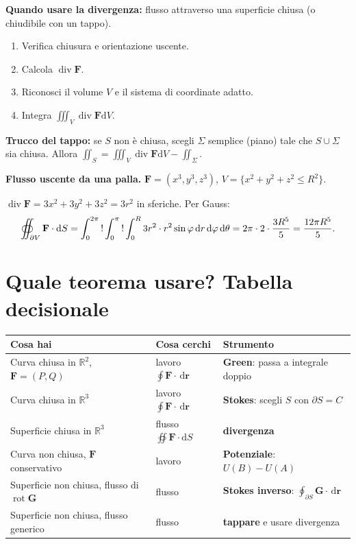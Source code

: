 \documentclass[11pt,a4paper,openany]{book}
\theoremstyle{plain}
\theoremstyle{definition}
\theoremstyle{remark}
\newcommand{\R}{\mathbb{R}}
\newcommand{\dd}{\,\mathrm{d}}
\newcommand{\Div}{\operatorname{div}}
\newcommand{\Rot}{\operatorname{rot}}
\renewcommand{\vec}[1]{\mathbf{#1}}
\newcommand{\F}{\mathbf{F}}
\newcommand{\rr}{\mathbf{r}}
\newcommand{\dS}{\mathrm{d}S}
\newcommand{\dV}{\mathrm{d}V}
\begin{document}
\begin{ricetta}
\textbf{Quando usare la divergenza:} flusso attraverso una superficie chiusa
(o chiudibile con un tappo).
\begin{enumerate}[leftmargin=*]
  \item Verifica chiusura e orientazione uscente.
  \item Calcola $\Div\F$.
  \item Riconosci il volume $V$ e il sistema di coordinate adatto.
  \item Integra $\iiint_V\Div\F\dV$.
\end{enumerate}
\textbf{Trucco del tappo:} se $S$ non \`e chiusa, scegli $\Sigma$ semplice
(piano) tale che $S\cup\Sigma$ sia chiusa. Allora
$\iint_S=\iiint_V\Div\F\dV-\iint_\Sigma$.
\end{ricetta}

\begin{esempio}
\textbf{Flusso uscente da una palla.} $\F=(x^3,y^3,z^3)$,
$V=\{x^2+y^2+z^2\le R^2\}$.

$\Div\F=3x^2+3y^2+3z^2=3r^2$ in sferiche. Per Gauss:
\[
  \oiint_{\partial V}\F\cdot\dS=\int_0^{2\pi}\\!\int_0^\pi\\!\int_0^R 3r^2\cdot r^2\sin\varphi\dd r\dd\varphi\dd\theta
  =2\pi\cdot 2\cdot\frac{3R^5}{5}=\frac{12\pi R^5}{5}.
\]
\end{esempio}

\section{Quale teorema usare? Tabella decisionale}

\begin{center}
\renewcommand{\arraystretch}{1.25}
\begin{tabular}{|p{4.2cm}|p{4.2cm}|p{6cm}|}
\hline
\textbf{Cosa hai} & \textbf{Cosa cerchi} & \textbf{Strumento}\\\hline
Curva chiusa in $\R^2$, $\F=(P,Q)$ & lavoro $\oint\F\cdot\dd\rr$ & \textbf{Green}: passa a integrale doppio\\\hline
Curva chiusa in $\R^3$ & lavoro $\oint\F\cdot\dd\rr$ & \textbf{Stokes}: scegli $S$ con $\partial S=C$\\\hline
Superficie chiusa in $\R^3$ & flusso $\oiint\F\cdot\dS$ & \textbf{divergenza}\\\hline
Curva non chiusa, $\F$ conservativo & lavoro & \textbf{Potenziale}: $U(B)-U(A)$\\\hline
Superficie non chiusa, flusso di $\Rot\vec{G}$ & flusso & \textbf{Stokes inverso}: $\oint_{\partial S}\vec{G}\cdot\dd\rr$\\\hline
Superficie non chiusa, flusso generico & flusso & \textbf{tappare} e usare divergenza\\\hline
\end{tabular}
\end{center}
\end{document}
